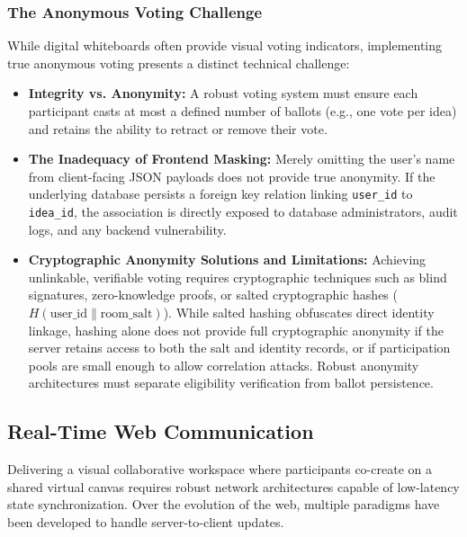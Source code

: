 \subsubsection{The Anonymous Voting Challenge}
While digital whiteboards often provide visual voting indicators, implementing true anonymous voting presents a distinct technical challenge:
\begin{itemize}
    \item \textbf{Integrity vs. Anonymity:} A robust voting system must ensure each participant casts at most a defined number of ballots (e.g., one vote per idea) and retains the ability to retract or remove their vote.
    \item \textbf{The Inadequacy of Frontend Masking:} Merely omitting the user's name from client-facing JSON payloads does not provide true anonymity. If the underlying database persists a foreign key relation linking \texttt{user\_id} to \texttt{idea\_id}, the association is directly exposed to database administrators, audit logs, and any backend vulnerability.
    \item \textbf{Cryptographic Anonymity Solutions and Limitations:} Achieving unlinkable, verifiable voting requires cryptographic techniques such as blind signatures, zero-knowledge proofs, or salted cryptographic hashes ($H(\text{user\_id} \parallel \text{room\_salt})$). While salted hashing obfuscates direct identity linkage, hashing alone does not provide full cryptographic anonymity if the server retains access to both the salt and identity records, or if participation pools are small enough to allow correlation attacks. Robust anonymity architectures must separate eligibility verification from ballot persistence.
\end{itemize}


\subsection{Real-Time Web Communication}
\label{subsec:realtime_web}

Delivering a visual collaborative workspace where participants co-create on a shared virtual canvas requires robust network architectures capable of low-latency state synchronization. Over the evolution of the web, multiple paradigms have been developed to handle server-to-client updates.

